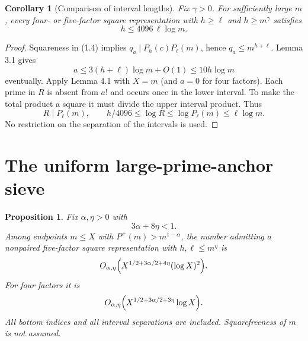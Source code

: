 \documentclass[letterpaper]{article}
\newtheorem{proposition}[theorem]{Proposition}
\newtheorem{corollary}[theorem]{Corollary}
\theoremstyle{definition}
\theoremstyle{remark}
\numberwithin{equation}{section}
\begin{document}
\begin{corollary}[Comparison of interval lengths]
Fix $\gamma>0$. For sufficiently large $m$, every
four- or five-factor square representation with $h\ge\ell$ and $h\ge m^\gamma$ satisfies
\begin{equation}
  h\le 4096\,\ell\log m.
\end{equation}
\end{corollary}

\begin{proof}
Squareness in (1.4) implies $q_a\mid P_h(c)P_\ell(m)$, hence $q_a\le m^{h+\ell}$. Lemma 3.1 gives
\[
  a\le 3(h+\ell)\log m+O(1)\le 10h\log m
\]
eventually. Apply Lemma 4.1 with $X=m$ (and $a=0$ for four factors). Each prime in $R$ is
absent from $a!$ and occurs once in the lower interval. To make the total product a square it must
divide the upper interval product. Thus
\[
  R\mid P_\ell(m),\qquad h/4096\le\log R\le\log P_\ell(m)\le\ell\log m.
\]
No restriction on the separation of the intervals is used.
\end{proof}

\section{The uniform large-prime-anchor sieve}

\begin{proposition}
Fix $\alpha,\eta>0$ with
\begin{equation}
  3\alpha+8\eta<1.
\end{equation}
Among endpoints $m\le X$ with $P^+(m)>m^{1-\alpha}$, the number admitting a nonpaired five-factor
square representation with $h,\ell\le m^\eta$ is
\begin{equation}
  O_{\alpha,\eta}\Bigl(X^{1/2+3\alpha/2+4\eta}(\log X)^2\Bigr).
\end{equation}
For four factors it is
\begin{equation}
  O_{\alpha,\eta}\Bigl(X^{1/2+3\alpha/2+3\eta}\log X\Bigr).
\end{equation}
All bottom indices and all interval separations are included. Squarefreeness of $m$ is not assumed.
\end{proposition}
\end{document}
